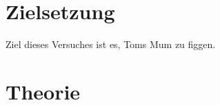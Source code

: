 \section{Zielsetzung}

Ziel dieses Versuches ist es, Toms Mum zu figgen.

\section{Theorie}
\label{sec:Theorie}

